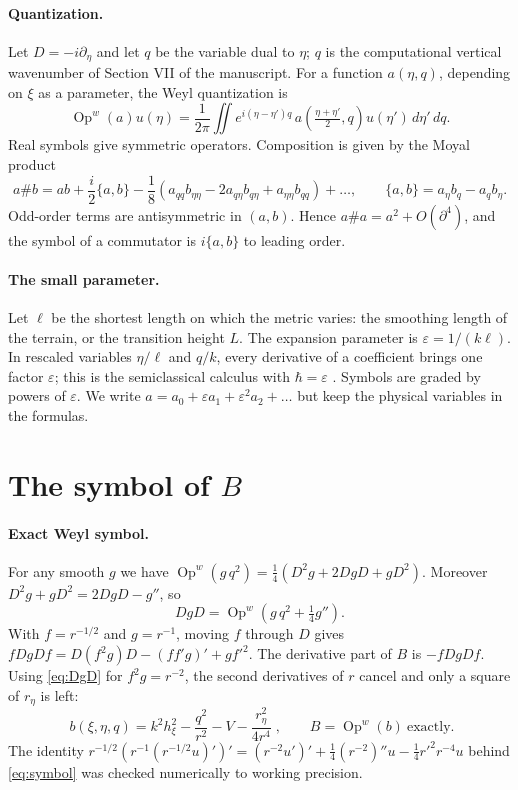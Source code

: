 \documentclass[11pt]{article}
\newcommand{\pd}{\partial}
\newcommand{\Op}{\operatorname{Op}^w}
\begin{document}
\paragraph{Quantization.} Let $D=-i\pd_\eta$ and let $q$ be the variable dual
to $\eta$; $q$ is the computational vertical wavenumber of Section VII of the
manuscript. For a function $a(\eta,q)$, depending on $\xi$ as a parameter, the
Weyl quantization is
\[
\Op(a)u(\eta)=\frac1{2\pi}\iint e^{i(\eta-\eta')q}\,a\!\left(\tfrac{\eta+\eta'}2,q\right)u(\eta')\,d\eta'\,dq .
\]
Real symbols give symmetric operators. Composition is given by the Moyal product
\begin{equation}\label{eq:moyal}
a\#b=ab+\frac i2\{a,b\}-\frac18\left(a_{qq}b_{\eta\eta}-2a_{q\eta}b_{q\eta}+a_{\eta\eta}b_{qq}\right)+\dots,\qquad
\{a,b\}=a_\eta b_q-a_qb_\eta .
\end{equation}
Odd-order terms are antisymmetric in $(a,b)$. Hence $a\#a=a^2+O(\pd^4)$, and the
symbol of a commutator is $i\{a,b\}$ to leading order.

\paragraph{The small parameter.} Let $\ell$ be the shortest length on which the
metric varies: the smoothing length of the terrain, or the transition height
$L$. The expansion parameter is $\varepsilon=1/(k\ell)$. In rescaled variables
$\eta/\ell$ and $q/k$, every derivative of a coefficient brings one factor
$\varepsilon$; this is the semiclassical calculus with $\hbar=\varepsilon$
\cite{zworski,dimassi}. Symbols are graded by powers of $\varepsilon$. We write
$a=a_0+\varepsilon a_1+\varepsilon^2a_2+\dots$ but keep the physical
variables in the formulas.

\section{The symbol of $B$}

\paragraph{Exact Weyl symbol.} For any smooth $g$ we have
$\Op(g\,q^2)=\tfrac14(D^2g+2DgD+gD^2)$. Moreover
$D^2g+gD^2=2DgD-g''$, so
\begin{equation}\label{eq:DgD}
DgD=\Op\!\left(g\,q^2+\tfrac14 g''\right).
\end{equation}
With $f=r^{-1/2}$ and $g=r^{-1}$, moving $f$ through $D$ gives
$fDgDf=D(f^2g)D-(ff'g)'+g f'^2$. The derivative part of $B$ is
$-fDgDf$. Using \eqref{eq:DgD} for $f^2g=r^{-2}$, the second derivatives of $r$
cancel and only a square of $r_\eta$ is left:
\begin{equation}\label{eq:symbol}
\boxed{\;b(\xi,\eta,q)=k^2h_\xi^2-\frac{q^2}{r^2}-V-\frac{r_\eta^2}{4r^4}\;},
\qquad B=\Op(b)\ \text{exactly}.
\end{equation}
The identity $r^{-1/2}(r^{-1}(r^{-1/2}u)')'=(r^{-2}u')'+\tfrac14(r^{-2})''u-\tfrac14r'^2r^{-4}u$
behind \eqref{eq:symbol} was checked numerically to working precision.
\end{document}
